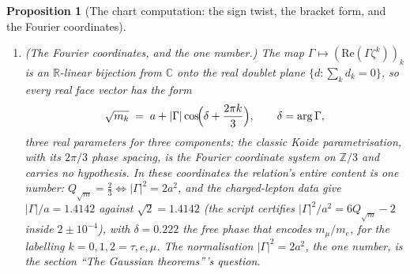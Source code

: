 \documentclass[11pt]{article}
\newtheorem{proposition}[theorem]{Proposition}
\theoremstyle{definition}
\theoremstyle{plain}
\providecommand{\C}{}\renewcommand{\C}{\mathbb{C}}
\providecommand{\R}{}\renewcommand{\R}{\mathbb{R}}
\begin{document}
\begin{proposition}[The chart computation: the sign twist, the bracket form, and the Fourier coordinates]
\begin{enumerate}
\item \emph{(The Fourier coordinates, and the one number.)} The map $\Gamma \mapsto (\mathrm{Re}(\Gamma\zeta^{k}))_{k}$ is an $\R$-linear bijection from $\C$ onto the real doublet plane $\{d : \sum_{k} d_{k} = 0\}$, so every real face vector has the form
\begin{equation}
\sqrt{m_{k}} \;=\; a + |\Gamma|\cos\!\Bigl(\delta + \frac{2\pi k}{3}\Bigr), \qquad \delta = \arg\Gamma,
\end{equation}
three real parameters for three components: the classic Koide parametrisation, with its $2\pi/3$ phase spacing, is the Fourier coordinate system on $\mathbb{Z}/3$ and carries no hypothesis. In these coordinates the relation's entire content is one number: $Q_{\sqrt{m}} = \tfrac23 \iff |\Gamma|^{2} = 2a^{2}$, and the charged-lepton data give $|\Gamma|/a = 1.4142$ against $\sqrt{2} = 1.4142$ (the script certifies $|\Gamma|^{2}/a^{2} = 6Q_{\sqrt{m}} - 2$ inside $2 \pm 10^{-4}$), with $\delta = 0.222$ the free phase that encodes $m_{\mu}/m_{e}$, for the labelling $k = 0, 1, 2 = \tau, e, \mu$. The normalisation $|\Gamma|^{2} = 2a^{2}$, the one number, is the section ``The Gaussian theorems'''s question.
\end{enumerate}
\end{proposition}
\end{document}
